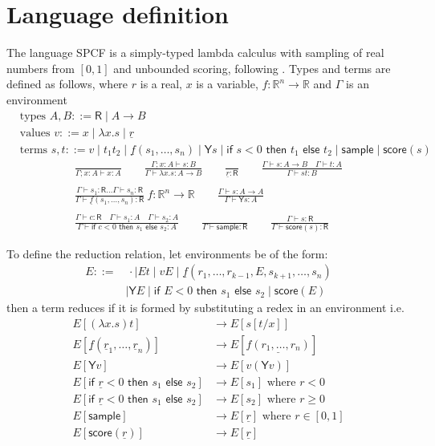 \documentclass{article}
\newcommand{\tY}{\textsf{Y}}
\newcommand{\tif}[3]{\textsf{if }#1\textsf{ then }#2\textsf{ else }#3}
\newcommand{\tsample}{\textsf{sample}}
\newcommand{\tscore}{\textsf{score}}
\begin{document}
\section{Language definition}
The language SPCF is a simply-typed lambda calculus with sampling of real numbers from $[0,1]$ and unbounded scoring, following \cite{MakOP20b}. Types and terms are defined as follows, where $r$ is a real, $x$ is a variable, $f : \mathbb{R}^n \to \mathbb{R}$ and $\Gamma$ is an environment
\begin{align*}
  & \text{types } A, B ::= \textsf{R}  \mid  A \to B \\
  & \text{values } v ::= x  \mid  \lambda x.s  \mid  \underline{r} \\
  & \text{terms } s, t ::= v  \mid  t_1 t_2  \mid  \underline{f}(s_1,\dots ,s_n)  \mid  \tY s  \mid  \tif{s < 0}{t_1}{t_2}  \mid  \tsample  \mid  \tscore(s)
\end{align*}
\begin{align*}
  \frac{}{\Gamma ; x:A \vdash x:A} \qquad
  \frac{\Gamma ; x:A \vdash s : B}{\Gamma \vdash \lambda x.s : A \to B} \qquad
  \frac{}{\underline{r} : \textsf{R}} \qquad
  \frac{\Gamma \vdash s:A \to B \quad \Gamma \vdash t : A}{\Gamma \vdash s t : B} \\ \\
  \frac{\Gamma \vdash s_1:\textsf{R} \dots \Gamma \vdash s_n:\textsf{R}}{\Gamma \vdash \underline{f}(s_1,\dots,s_n) : \textsf{R}} \ f : \mathbb{R}^n \to \mathbb{R} \qquad
  \frac{\Gamma \vdash s : A \to A}{\Gamma \vdash \tY s : A} \\ \\
  \frac{\Gamma \vdash c : \textsf{R} \quad \Gamma \vdash s_1 : A \quad \Gamma \vdash s_2 : A}{\Gamma \vdash \tif{c < 0}{s_1}{s_2} : A} \qquad
  \frac{}{\Gamma \vdash \tsample : \textsf{R}} \qquad
  \frac{\Gamma \vdash s : \textsf{R}}{\Gamma \vdash \tscore (s) : \textsf{R}}
\end{align*}

To define the reduction relation, let environments be of the form:
\begin{align*}
  E ::= & \, \cdot \mid E t \mid v E \mid \underline{f}(r_1,\dots ,r_{k-1}, E, s_{k+1}, \dots, s_n) \\ & \mid \tY E \mid \tif{E<0}{s_1}{s_2} \mid \tscore (E)
\end{align*}
then a term reduces if it is formed by substituting a redex in an environment i.e.
\begin{align*}
  E[(\lambda x.s) t] & \to E[s[t/x]] \\
  E[\underline f (\underline r_1, \dots , \underline r_n)] & \to E[\underline{f(r_1,\dots,r_n)}] \\
  E[\tY v] & \to E[v (\tY v)] \\
  E[\tif{\underline r < 0}{s_1}{s_2}] & \to E[s_1] \text{ where }r < 0 \\
  E[\tif{\underline r < 0}{s_1}{s_2}] & \to E[s_2] \text{ where }r \geq 0 \\
  E[\tsample] & \to E[\underline r] \text{ where } r \in [0,1] \\
  E[\tscore(\underline r)] & \to E[\underline r]
\end{align*}
\end{document}

